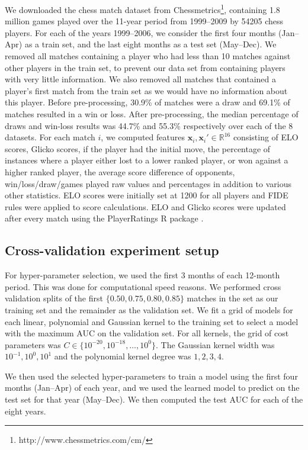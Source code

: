 \documentclass[twoside,11pt]{article}
\newcommand{\RR}{\mathbb R}
\begin{document}
We downloaded the chess match dataset from Chessmetrics\footnote{http://www.chessmetrics.com/cm/}, containing
1.8 million games played over the 11-year period from 1999--2009 by
54205 chess players.  For each of the years 1999--2006, we consider the
first four months (Jan--Apr) as a train set, and the last eight months
as a test set (May--Dec). 
We
removed all matches containing a player who had less than 10 matches
against other players in the train set, to prevent our data set from
containing players with very little information.  We also removed all
matches that contained a player's first match from the train set as we
would have no information about this player.  Before pre-processing, 30.9\% of matches were a draw and 69.1\% of matches resulted in a win or loss.  After pre-processing, the median percentage of draws and win-loss results was 44.7\% and 55.3\% respectively over each of the 8 datasets.
For each match $i$, we computed features
$\mathbf x_i,\mathbf x_i'\in\RR^{16}$ consisting of ELO
scores, Glicko scores, if the player had the initial move, the
percentage of instances where a player either lost to a lower ranked
player, or won against a higher ranked player, the average score
difference of opponents, win/loss/draw/games played raw values and
percentages in addition to various other statistics. ELO scores were
initially set at 1200 for all players and FIDE rules were applied to
score calculations.  ELO and Glicko scores were updated after every
match using the PlayerRatings R package  \citep{play-raitings}.  

\subsection{Cross-validation experiment setup}

For hyper-parameter selection, we used the first 3 months of each
12-month period.  This was done for computational speed reasons.  We performed cross validation splits of the first
$\{0.50,0.75,0.80,0.85\}$ matches in the set as our training set and
the remainder as the validation set.  We fit a grid of models for each
linear, polynomial and Gaussian kernel to the training set to select a
model with the maximum AUC on the validation set.  For all kernels,
the grid of cost parameters was
$C\in\{10^{-20},10^{-18}, \dots,10^0\}$. The Gaussian kernel width was
$10^{-1},10^{0},10^1$ and the polynomial kernel degree was
$1,2,3,4$.  

We then used the selected hyper-parameters to train a
model using the first four months (Jan--Apr) of each year, and we used
the learned model to predict on the test set for that year
(May--Dec). We then computed the test AUC for each of the eight years. 
\end{document}
